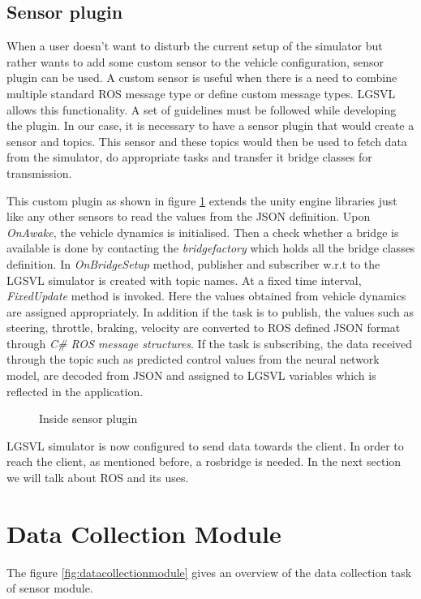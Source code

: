\subsection{Sensor plugin}
When a user doesn't want to disturb the current setup of the simulator but rather wants to add
some custom sensor to the vehicle configuration, sensor plugin can be used.  A custom sensor is useful when there is a need to combine multiple standard ROS
message type or define custom message types. LGSVL allows this functionality. A set of guidelines must be followed while developing the plugin. In our case,
it is necessary to have a sensor plugin that would create a sensor and topics. This sensor
and these topics would then be used to fetch data from the simulator, do appropriate tasks and transfer it
bridge classes for transmission.

This custom plugin as shown in figure \ref{fig:lgsvlsensorplugin} extends the unity engine libraries just like
any other sensors to read the values from the JSON definition. Upon \textit{OnAwake}, the
vehicle dynamics is initialised. Then a check whether a bridge is available is done by
contacting the \textit{bridgefactory} which holds all the bridge classes definition. In
\textit{OnBridgeSetup} method, publisher and subscriber w.r.t to the LGSVL simulator is
created with topic names. At a fixed time interval, \textit{FixedUpdate} method is invoked.
Here the values obtained from vehicle dynamics are assigned appropriately. In addition if
the task is to publish, the values such as steering, throttle, braking, velocity are
converted to ROS defined JSON format through \textit{C\# ROS message structures}.
If the task is subscribing, the data received through the topic such as predicted control values from the
neural network model, are decoded from JSON and assigned to LGSVL variables which is reflected in the application.

\begin{figure}[!ht]
	\centering
    \def\svgwidth{0.8\textwidth}
    \caption{Inside sensor plugin}
    \label{fig:lgsvlsensorplugin}
\end{figure}
LGSVL simulator is now configured to send data towards the client. In order to reach the
client, as mentioned before, a rosbridge is needed. In the next section we will talk
about ROS and its uses.

\section{Data Collection Module}
The figure \ref{fig:datacollectionmodule} gives an overview of the data collection task of
sensor module.

